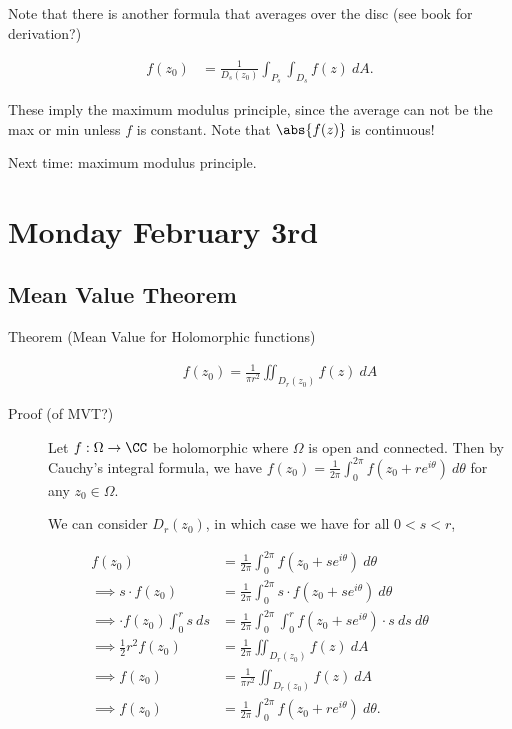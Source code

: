 Note that there is another formula that averages over the disc (see book
for derivation?)

\begin{align*}
f(z_0) &= \frac{1}{D_s(z_0)}  \int_{P_s} \int_{D_s} f(z) ~dA
.\end{align*}

These imply the maximum modulus principle, since the average can not be
the max or min unless \(f\) is constant. Note that \(\abs{f(z)}\) is
continuous!

Next time: maximum modulus principle.

\hypertarget{monday-february-3rd}{%
\section{Monday February 3rd}\label{monday-february-3rd}}

\hypertarget{mean-value-theorem}{%
\subsection{Mean Value Theorem}\label{mean-value-theorem}}

\begin{description}
\item[Theorem (Mean Value for Holomorphic functions)]
\begin{align*}f(z_0) = \frac{1}{\pi r^2} \iint_{D_r(z_0)} f(z) ~dA\end{align*}
\item[Proof (of MVT?)]
Let \(f: \Omega \to \CC\) be holomorphic where \(\Omega\) is open and
connected. Then by Cauchy's integral formula, we have
\(f(z_0) = \frac{1}{2\pi} \int_0^{2\pi} f(z_0 + re^{i\theta}) ~d\theta\)
for any \(z_0 \in \Omega\).

We can consider \(D_r(z_0)\), in which case we have for all
\(0 < s < r\),
\end{description}

\begin{align*}
f(z_0) &= \frac{1}{2\pi} \int_0^{2\pi} f(z_0 + se^{i\theta}) ~d\theta \\
\implies s\cdot f(z_0) &= \frac{1}{2\pi} \int_0^{2\pi} s\cdot f(z_0 + se^{i\theta}) ~d\theta \\
\implies \cdot f(z_0) \int_0^r s ~ds &= \frac{1}{2\pi} \int_0^{2\pi} \int_0^r f(z_0 + se^{i\theta})\cdot s ~ds~d\theta \\ 
\implies \frac 1 2 r^2 f(z_0) &= \frac{1}{2\pi} \iint_{D_r(z_0)} f(z) ~dA\\
\implies f(z_0) &= \frac{1}{\pi r^2} \iint_{D_r(z_0)} f(z) ~dA \\
\implies f(z_0) &= \frac{1}{2\pi} \int_0^{2\pi} f(z_0 + re^{i\theta}) ~d\theta
.\end{align*}

